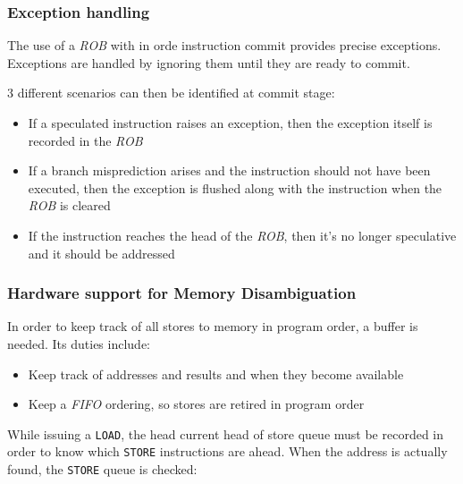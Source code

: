 \documentclass[english]{article}
\begin{document}
\subsubsection{Exception handling}

The use of a \textit{ROB} with in orde instruction commit provides precise exceptions.
Exceptions are handled by ignoring them until they are ready to commit.

3 different scenarios can then be identified at commit stage:

\begin{itemize}
  \item If a speculated instruction raises an exception, then the exception itself is recorded in the \textit{ROB}
  \item If a branch misprediction arises and the instruction should not have been executed, then the exception is flushed along with the instruction when the \textit{ROB} is cleared
  \item If the instruction reaches the head of the \textit{ROB}, then it's no longer speculative and it should be addressed
\end{itemize}

\subsubsection{Hardware support for Memory Disambiguation}

In order to keep track of all stores to memory in program order, a buffer is needed.
Its duties include:

\begin{itemize}
  \item Keep track of addresses and results and when they become available
  \item Keep a \textit{FIFO} ordering, so stores are retired in program order
\end{itemize}

While issuing a \texttt{LOAD}, the head current head of store queue must be recorded in order to know which \texttt{STORE} instructions are ahead.
When the address is actually found, the \texttt{STORE} queue is checked:
\end{document}
